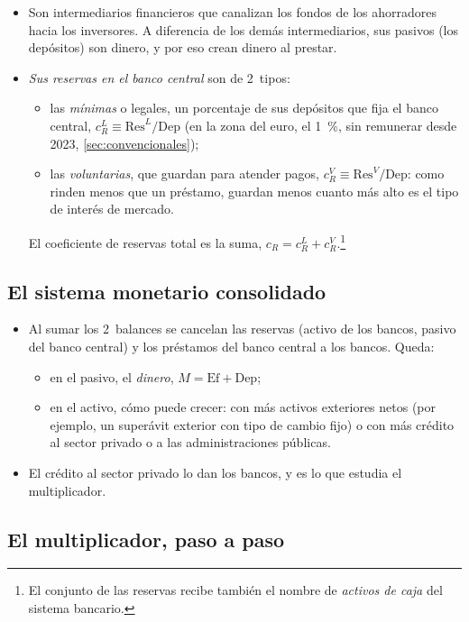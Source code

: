 \documentclass[11pt]{article}
\begin{document}
\begin{itemize}
\item Son intermediarios financieros que canalizan los fondos de los ahorradores hacia los inversores. A diferencia de los demás intermediarios, sus pasivos (los depósitos) son dinero, y por eso crean dinero al prestar.
\item \emph{Sus reservas en el banco central} son de 2~tipos:
  \begin{itemize}
  \item las \emph{mínimas} o legales, un porcentaje de sus depósitos que fija el banco central, $c_R^L\equiv\mathrm{Res}^L/\mathrm{Dep}$ (en la zona del euro, el 1~\%, sin remunerar desde 2023\nocite{BCE2011Medidas,BCE2023Reservas}, \ref{sec:convencionales});
  \item las \emph{voluntarias}, que guardan para atender pagos, $c_R^V\equiv\mathrm{Res}^V/\mathrm{Dep}$: como rinden menos que un préstamo, guardan menos cuanto más alto es el tipo de interés de mercado.
  \end{itemize}
  El coeficiente de reservas total es la suma, $c_R=c_R^L+c_R^V$.\footnote{El conjunto de las reservas recibe también el nombre de \emph{activos de caja} del sistema bancario.}
\end{itemize}

\subsection{El sistema monetario consolidado}

\begin{itemize}
\item Al sumar los 2~balances se cancelan las reservas (activo de los bancos, pasivo del banco central) y los préstamos del banco central a los bancos. Queda:
  \begin{itemize}
  \item en el pasivo, el \emph{dinero}, $M=\mathrm{Ef}+\mathrm{Dep}$;
  \item en el activo, cómo puede crecer: con más activos exteriores netos (por ejemplo, un superávit exterior con tipo de cambio fijo) o con más crédito al sector privado o a las administraciones públicas.
  \end{itemize}
\item El crédito al sector privado lo dan los bancos, y es lo que estudia el multiplicador.
\end{itemize}

\subsection{El multiplicador, paso a paso}
\end{document}
